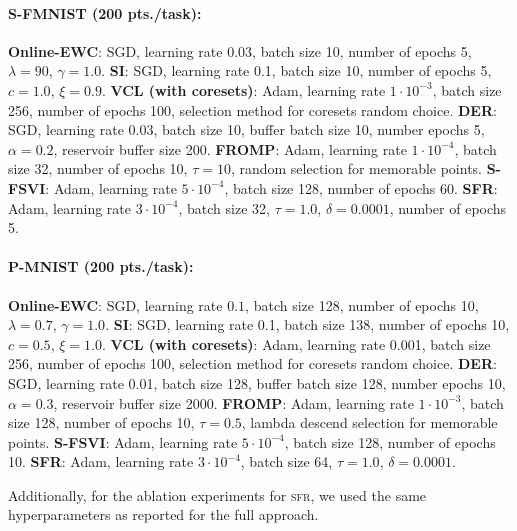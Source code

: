 \documentclass{article} %
\newcommand{\our}{\textsc{sfr}\xspace}
\begin{document}
\paragraph{S-FMNIST (200 pts./task):}
	\textbf{Online-EWC}: SGD, learning rate $0.03$, batch size  10, number of epochs 5, $\lambda=90$, $\gamma=1.0$.
	\textbf{SI}: SGD, learning rate 0.1, batch size 10, number of epochs 5, $c=1.0$, $\xi=0.9$.
	\textbf{VCL (with coresets)}: Adam, learning rate $1 \cdot 10^{-3}$, batch size 256, number of epochs 100, selection method for coresets random choice.
	\textbf{DER}: SGD, learning rate 0.03, batch size 10, buffer batch size 10, number epochs 5, $\alpha =  0.2$, reservoir buffer size 200.
	\textbf{FROMP}: Adam, learning rate $1 \cdot 10^{-4}$, batch size 32, number of epochs 10, $\tau = 10$, random selection for memorable points.
	\textbf{S-FSVI}: Adam, learning rate $5 \cdot 10^{-4}$, batch size 128, number of epochs 60.
	\textbf{SFR}: Adam, learning rate $3 \cdot 10^{-4}$, batch size 32, $\tau=1.0$, $\delta=0.0001$, number of epochs 5.


\paragraph{P-MNIST (200 pts./task):}
	\textbf{Online-EWC}: SGD, learning rate $0.1$, batch size 128, number of epochs 10, $\lambda=0.7$, $\gamma=1.0$.
	\textbf{SI}: SGD, learning rate 0.1, batch size 138, number of epochs 10, $c=0.5$, $\xi=1.0$.
	\textbf{VCL (with coresets)}: Adam, learning rate 0.001, batch size 256, number of epochs 100, selection method for coresets random choice.
	\textbf{DER}:  SGD, learning rate 0.01, batch size 128, buffer batch size 128, number epochs 10, $\alpha=0.3$, reservoir buffer size 2000.
	\textbf{FROMP}: Adam, learning rate $1 \cdot 10^{-3}$, batch size 128, number of epochs 10, $\tau = 0.5$, lambda descend selection for memorable points.
	\textbf{S-FSVI}: Adam, learning rate $5 \cdot 10^{-4}$, batch size 128, number of epochs 10.
	\textbf{SFR}: Adam, learning rate $3 \cdot 10^{-4}$, batch size 64, $\tau=1.0$, $\delta=0.0001$.


Additionally, for the ablation experiments for \our, we used the same hyperparameters as reported for the full approach.
\end{document}
